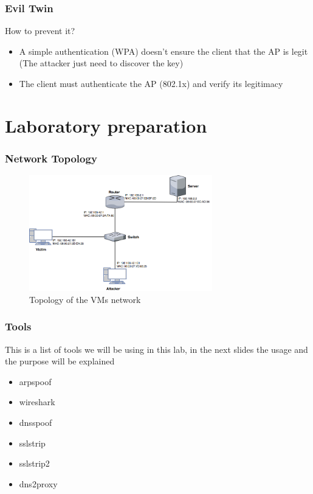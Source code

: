 \documentclass{beamer}
\begin{document}
\begin{frame}
  \frametitle{Evil Twin}
  \begin{block}{How to prevent it?}
  \pause
  \begin{itemize}
    \item A simple authentication (WPA) doesn't ensure the client that the AP is legit (The attacker just need to discover the key)
    \item The client must authenticate the AP (802.1x) and verify its legitimacy
  \end{itemize}
\end{block}
\end{frame}

\section{Laboratory preparation}
\begin{frame}
\frametitle{Network Topology}
\begin{figure}
  \includegraphics[height=190px]{../figures/net_topo}
  \caption*{Topology of the VMs network}
\end{figure}
\end{frame}


\begin{frame}
\frametitle{Tools}
This is a list of tools we will be using in this lab, in the next slides the usage and the purpose will be explained
\vfill
\begin{block}{}
  \begin{itemize}
    \item arpspoof
    \item wireshark
    \item dnsspoof
    \item sslstrip
    \item sslstrip2
    \item dns2proxy
  \end{itemize}
\end{block}

\end{frame}
\end{document}
